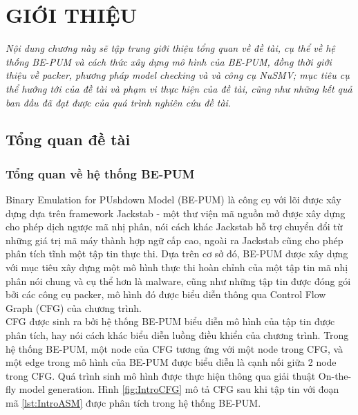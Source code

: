 
\newpage
{}

\chapter{GIỚI THIỆU}

\begin{concept}[15cm]
\textit{Nội dung chương này sẽ tập trung giới thiệu tổng quan về đề tài, cụ thể về hệ thống BE-PUM và cách thức xây dựng mô hình của BE-PUM, đồng thời giới thiệu về packer, phương pháp model checking và và công cụ NuSMV; mục tiêu cụ thể hướng tới của đề tài và phạm vi thực hiện của đề tài, cũng như những kết quả ban đầu đã đạt được của quá trình nghiên cứu đề tài.}
\end{concept}

\section{Tổng quan đề tài}

\subsection{Tổng quan về hệ thống BE-PUM}

\hspace{0.5cm}Binary Emulation for PUshdown Model (BE-PUM) là công cụ với lõi được xây dựng dựa trên framework Jackstab - một thư viện mã nguồn mở được xây dựng cho phép dịch ngược mã nhị phân, nói cách khác Jackstab hỗ trợ chuyển đổi từ những giá trị mã máy thành hợp ngữ cấp cao, ngoài ra Jackstab cũng cho phép phân tích tĩnh một tập tin thực thi. Dựa trên cơ sở đó, BE-PUM được xây dựng với mục tiêu xây dựng một mô hình thực thi hoàn chỉnh của một tập tin mã nhị phân nói chung và cụ thể hơn là malware, cũng như những tập tin được đóng gói bởi các công cụ packer, mô hình đó được biểu diễn thông qua Control Flow Graph (CFG) của chương trình.\\ 

\hspace{0.5cm}CFG được sinh ra bởi hệ thống BE-PUM biểu diễn mô hình của tập tin được phân tích, hay nói cách khác biểu diễn luồng điều khiển của chương trình. Trong hệ thống BE-PUM, một node của CFG tương ứng với một node trong CFG, và một edge trong mô hình của BE-PUM được biểu diễn là cạnh nối giữa 2 node trong CFG. Quá trình sinh mô hình được thực hiện thông qua giải thuật On-the-fly model generation. Hình \ref {fig:IntroCFG} mô tả CFG sau khi tập tin với đoạn mã \ref {lst:IntroASM} được phân tích trong hệ thống BE-PUM.

